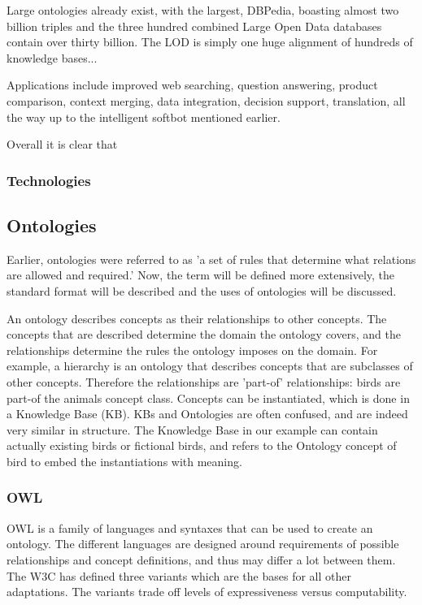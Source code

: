 \documentclass{article}
\begin{document}
 Large ontologies already exist, with the largest, DBPedia, boasting almost two billion triples and the three hundred combined Large Open Data databases contain over thirty billion. \cite{dbpedia, lod} The LOD is simply one huge alignment of hundreds of knowledge bases... %
 
 Applications include improved web searching, question answering, product comparison, context merging, data integration, decision support, translation, all the way up to the intelligent softbot mentioned earlier. %
 
 
 Overall it is clear that %
 \subsubsection{Technologies}
 
 
 \subsection{Ontologies}
 Earlier, ontologies were referred to as 'a set of rules that determine what relations are allowed and required.' Now, the term will be defined more extensively, the standard format will be described and the uses of ontologies will be discussed.
 
 An ontology describes concepts as their relationships to other concepts. The concepts that are described determine the domain the ontology covers, and the relationships determine the rules the ontology imposes on the domain. For example, a hierarchy is an ontology that describes concepts that are subclasses of other concepts. Therefore the relationships are 'part-of' relationships: birds are part-of the animals concept class.
 Concepts can be instantiated, which is done in a Knowledge Base (KB). KBs and Ontologies are often confused, and are indeed very similar in structure. The Knowledge Base in our example can contain actually existing birds or fictional birds, and refers to the Ontology concept of bird to embed the instantiations with meaning.
 \subsubsection{OWL}
 OWL is a family of languages and syntaxes that can be used to create an ontology. The different languages are designed around requirements of possible relationships and concept definitions, and thus may differ a lot between them. The W3C has defined three variants which are the bases for all other adaptations. The variants trade off levels of expressiveness versus computability.
\end{document}
